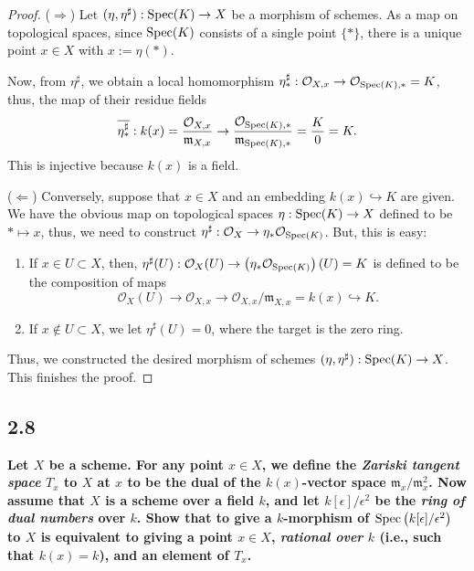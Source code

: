 \documentclass[11pt]{amsart}          %
\newcommand{\calO}{\mathcal{O}}
\newcommand{\spec}{{\rm Spec}}
\begin{document}
\begin{proof}($\Rightarrow$) Let $(\eta, \eta^{\sharp}): \spec (K) \to X$ be a morphism of schemes. As a map on topological spaces, since $\spec (K)$ consists of a single point $\{*\}$, there is a unique point $x \in X$ with $x:= \eta (*)$.

Now, from $\eta^{\sharp}$, we obtain a local homomorphism $\eta^{\sharp} _* : \calO_{X, x} \to \calO_{\spec (K), *} = K$, thus, the map of their residue fields
$$\overline{\eta^{\sharp} _*} : k(x)  = \frac{\calO_{X,x}}{\mathfrak{m}_{X, x}} \to \frac{\calO_{\spec (K), *}}{\mathfrak{m}_{\spec (K), *}} = \frac{K}{0} = K.$$ This is injective because $k(x)$ is a field.

\noindent ($\Leftarrow$) Conversely, suppose that $x \in X$ and an embedding $k(x) \hookrightarrow K$ are given. We have the obvious map on topological spaces $\eta: \spec (K) \to X$ defined to be $* \mapsto x$, thus, we need to construct $\eta^{\sharp} : \calO_X \to \eta_{*} \calO_{\spec (K)}$. But, this is easy:

\begin{enumerate}
\item [ ] If $x \in U \subset X$, then, $\eta^{\sharp} (U): \calO_X (U) \to \left( \eta_* \calO_{\spec (K)} \right) (U) = K$ is defined to be the composition of maps
$$\calO_{X } (U) \to \calO_{X, x} \to \calO_{X,x} / \mathfrak{m}_{X, x} = k(x) \hookrightarrow K.$$

\item [ ] If $x \not \in U \subset X$, we let $\eta^{\sharp} (U) = 0$, where the target is the zero ring. 
\end{enumerate}

Thus, we constructed the desired morphism of schemes $(\eta, \eta^{\sharp}) : \spec (K) \to X$. This finishes the proof.\end{proof}

\subsection*{2.8}\textbf{Let $X$ be a scheme. For any point $x \in X$, we define the {\it Zariski tangent space} $T_x$ to $X$ at $x$ to be the dual of the $k(x)$-vector space $\mathfrak{m}_x / \mathfrak{m} _x ^2$. Now assume that $X$ is a scheme over a field $k$, and let $k[\epsilon] / \epsilon^2$ be the {\it ring of dual numbers} over $k$. Show that to give a $k$-morphism of $\spec \left( k[\epsilon]/ \epsilon^2 \right)$ to $X$ is equivalent to giving a point $x \in X$, {\it rational over } $k$ (i.e., such that $k(x) = k$), and an element of $T_x$.}
\end{document}
